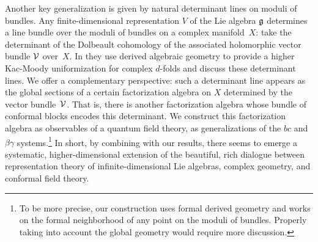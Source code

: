 Another key generalization is given by natural determinant lines on moduli of bundles.
Any finite-dimensional representation $V$ of the Lie algebra $\mathfrak g$ determines a line bundle over the moduli of bundles on a complex manifold~$X$: 
take the determinant of the Dolbeault cohomology of the associated holomorphic vector bundle $\mathcal{V}$ over~$X$.
In \cite{FHK} they use derived algebraic geometry to provide a higher Kac-Moody uniformization for complex $d$-folds and discuss these determinant lines.
We offer a complementary perspective: such a determinant line appears as the global sections of a certain factorization algebra on $X$ determined by the vector bundle~$\mathcal{V}$.
That is, there is another factorization algebra whose bundle of conformal blocks encodes this determinant.
We construct this factorization algebra as observables of a quantum field theory,
as generalizations of the $bc$ and $\beta\gamma$ systems.\footnote{To be more precise, our construction uses formal derived geometry and works on the formal neighborhood of any point on the moduli of bundles. 
Properly taking into account the global geometry would require more discussion.}
In short, by combining \cite{FHK} with our results, 
there seems to emerge a systematic, higher-dimensional extension of the beautiful, rich dialogue between representation theory of infinite-dimensional Lie algebras, complex geometry, and conformal field theory.

%

